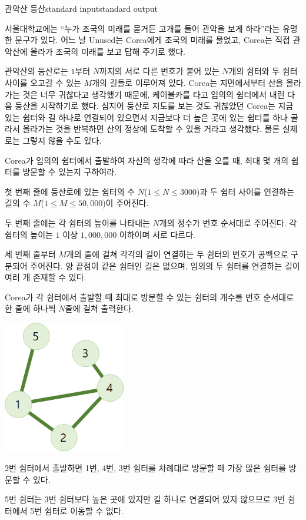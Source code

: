 \begin{problem}{관악산 등산}{standard input}{standard output}

서울대학교에는 ``누가 조국의 미래를 묻거든 고개를 들어 관악을 보게 하라''라는 유명한 문구가 있다. 어느 날 Unused는 Corea에게 조국의 미래를 물었고, Corea는 직접 관악산에 올라가 조국의 미래를 보고 답해 주기로 했다.

관악산의 등산로는 $1$부터 $N$까지의 서로 다른 번호가 붙어 있는 $N$개의 쉼터와 두 쉼터 사이를 오고갈 수 있는 $M$개의 길들로 이루어져 있다. Corea는 지면에서부터 산을 올라가는 것은 너무 귀찮다고 생각했기 때문에, 케이블카를 타고 임의의 쉼터에서 내린 다음 등산을 시작하기로 했다. 심지어 등산로 지도를 보는 것도 귀찮았던 Corea는 지금 있는 쉼터와 길 하나로 연결되어 있으면서 지금보다 더 높은 곳에 있는 쉼터를 하나 골라서 올라가는 것을 반복하면 산의 정상에 도착할 수 있을 거라고 생각했다. 물론 실제로는 그렇지 않을 수도 있다.

Corea가 임의의 쉼터에서 출발하여 자신의 생각에 따라 산을 오를 때, 최대 몇 개의 쉼터를 방문할 수 있는지 구하여라.

\InputFile
첫 번째 줄에 등산로에 있는 쉼터의 수 $N$($1 \le N \le 3000$)과 두 쉼터 사이를 연결하는 길의 수 $M$($1 \le M \le 50,000$)이 주어진다.

두 번째 줄에는 각 쉼터의 높이를 나타내는 $N$개의 정수가 번호 순서대로 주어진다. 각 쉼터의 높이는 $1$ 이상 $1,000,000$ 이하이며 서로 다르다.

세 번째 줄부터 $M$개의 줄에 걸쳐 각각의 길이 연결하는 두 쉼터의 번호가 공백으로 구분되어 주어진다. 양 끝점이 같은 쉼터인 길은 없으며, 임의의 두 쉼터를 연결하는 길이 여러 개 존재할 수 있다.

\OutputFile
Corea가 각 쉼터에서 출발할 때 최대로 방문할 수 있는 쉼터의 개수를 번호 순서대로 한 줄에 하나씩 $N$줄에 걸쳐 출력한다.

\Example

\begin{example}
%
\end{example}

\Notes
\begin{center}
  \includegraphics[width=0.4\textwidth]{climb.png}
\end{center}

2번 쉼터에서 출발하면 1번, 4번, 3번 쉼터를 차례대로 방문할 때 가장 많은 쉼터를 방문할 수 있다.

5번 쉼터는 3번 쉼터보다 높은 곳에 있지만 길 하나로 연결되어 있지 않으므로 3번 쉼터에서 5번 쉼터로 이동할 수 없다.

\end{problem}
